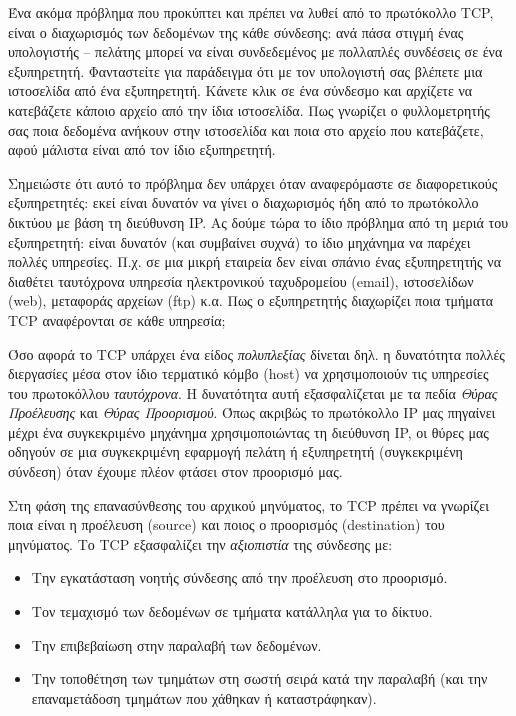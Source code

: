 Ένα ακόμα πρόβλημα που προκύπτει και πρέπει να λυθεί από το πρωτόκολλο TCP, είναι ο διαχωρισμός των δεδομένων της κάθε σύνδεσης: ανά πάσα στιγμή ένας υπολογιστής -- πελάτης μπορεί να είναι συνδεδεμένος με πολλαπλές συνδέσεις σε ένα εξυπηρετητή. Φανταστείτε για παράδειγμα ότι με τον υπολογιστή σας βλέπετε μια ιστοσελίδα από ένα εξυπηρετητή. Κάνετε κλικ σε ένα σύνδεσμο και αρχίζετε να κατεβάζετε κάποιο αρχείο από την ίδια ιστοσελίδα. Πως γνωρίζει ο φυλλομετρητής σας ποια δεδομένα ανήκουν στην ιστοσελίδα και ποια στο αρχείο που κατεβάζετε, αφού μάλιστα είναι από τον ίδιο εξυπηρετητή.

Σημειώστε ότι αυτό το πρόβλημα δεν υπάρχει όταν αναφερόμαστε σε διαφορετικούς εξυπηρετητές: εκεί είναι δυνατόν να γίνει ο διαχωρισμός ήδη από το πρωτόκολλο δικτύου με βάση τη διεύθυνση IP. Ας δούμε τώρα το ίδιο πρόβλημα από τη μεριά του εξυπηρετητή: είναι δυνατόν (και συμβαίνει συχνά) το ίδιο μηχάνημα να παρέχει πολλές υπηρεσίες. Π.χ. σε μια μικρή εταιρεία δεν είναι σπάνιο ένας εξυπηρετητής να διαθέτει ταυτόχρονα υπηρεσία ηλεκτρονικού ταχυδρομείου (email), ιστοσελίδων (web), μεταφοράς αρχείων (ftp) κ.α. Πως ο εξυπηρετητής διαχωρίζει ποια τμήματα TCP αναφέρονται σε κάθε υπηρεσία;

Όσο αφορά το TCP υπάρχει ένα είδος \emph{πολυπλεξίας} δίνεται δηλ. η δυνατότητα πολλές διεργασίες μέσα στον ίδιο τερματικό κόμβο (host) να χρησιμοποιούν τις υπηρεσίες του πρωτοκόλλου \emph{ταυτόχρονα}. Η δυνατότητα αυτή εξασφαλίζεται με τα πεδία \emph{Θύρας Προέλευσης} και \emph{Θύρας Προορισμού}. Όπως ακριβώς το πρωτόκολλο IP μας πηγαίνει μέχρι ένα συγκεκριμένο μηχάνημα χρησιμοποιώντας τη διεύθυνση IP, οι θύρες μας οδηγούν σε μια συγκεκριμένη εφαρμογή πελάτη ή εξυπηρετητή (συγκεκριμένη σύνδεση) όταν έχουμε πλέον φτάσει στον προορισμό μας.

Στη φάση της επανασύνθεσης του αρχικού μηνύματος, το TCP πρέπει να γνωρίζει ποια είναι η προέλευση (source) και ποιος ο προορισμός (destination) του μηνύματος. Το TCP εξασφαλίζει την \emph{αξιοπιστία} της σύνδεσης με:

\begin{itemize}
\item Την εγκατάσταση νοητής σύνδεσης από την προέλευση στο προορισμό.
\item Τον τεμαχισμό των δεδομένων σε τμήματα κατάλληλα για το δίκτυο.
\item Την επιβεβαίωση στην παραλαβή των δεδομένων.
\item Την τοποθέτηση των τμημάτων στη σωστή σειρά κατά την παραλαβή (και την επαναμετάδοση τμημάτων που χάθηκαν ή καταστράφηκαν).
\end{itemize}

